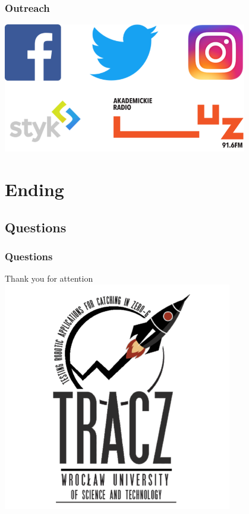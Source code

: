 \documentclass[xcolor=dvipsnames]{beamer}%
\begin{document}
\begin{frame}
\frametitle{Outreach}
\centering
\includegraphics[width=0.8\textwidth]{figure/outreach.png}
\end{frame}

\section*{Ending}
\subsection*{Questions}

\begin{frame}
\frametitle{Questions}
  \centering
\Huge Thank you for attention
\includegraphics[height=0.7\textheight]{figure/logoTRACZ.pdf}


\end{frame}




\end{document}
